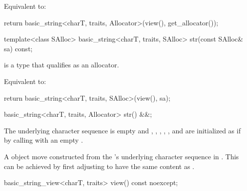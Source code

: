 \begin{itemdescr}
\pnum
\effects
Equivalent to:
\begin{codeblock}
return basic_string<charT, traits, Allocator>(view(), get_allocator());
\end{codeblock}
\end{itemdescr}

%
\begin{itemdecl}
template<class SAlloc>
  basic_string<charT, traits, SAlloc> str(const SAlloc& sa) const;
\end{itemdecl}

\begin{itemdescr}
\pnum
\constraints
{} is a type that
qualifies as an allocator.

\pnum
\effects
Equivalent to:
\begin{codeblock}
return basic_string<charT, traits, SAlloc>(view(), sa);
\end{codeblock}
\end{itemdescr}

\begin{itemdecl}
basic_string<charT, traits, Allocator> str() &&;
\end{itemdecl}

\begin{itemdescr}
\pnum
\ensures
The underlying character sequence  is empty and
, , , ,
, and 
are initialized as if by calling 
with an empty .

\pnum
\returns
A  object
move constructed from
the 's underlying character sequence in .
This can be achieved by first adjusting  to have
the same content as .
\end{itemdescr}

%
\begin{itemdecl}
basic_string_view<charT, traits> view() const noexcept;
\end{itemdecl}

